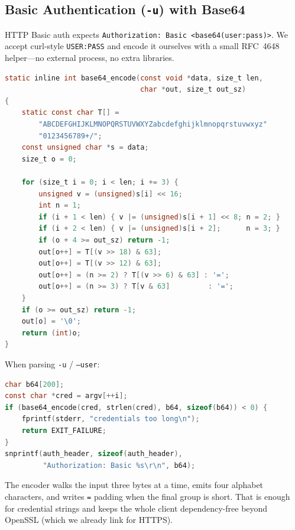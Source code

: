 \subsection{Basic Authentication (\texttt{-u}) with Base64}

HTTP Basic auth expects
\texttt{Authorization: Basic <base64(user:pass)>}.
We accept curl-style \texttt{USER:PASS} and encode it ourselves with a small
RFC~4648 helper---no external process, no extra libraries.

\begin{lstlisting}[style=snippet,language=C]
static inline int base64_encode(const void *data, size_t len,
                                char *out, size_t out_sz)
{
    static const char T[] =
        "ABCDEFGHIJKLMNOPQRSTUVWXYZabcdefghijklmnopqrstuvwxyz"
        "0123456789+/";
    const unsigned char *s = data;
    size_t o = 0;

    for (size_t i = 0; i < len; i += 3) {
        unsigned v = (unsigned)s[i] << 16;
        int n = 1;
        if (i + 1 < len) { v |= (unsigned)s[i + 1] << 8; n = 2; }
        if (i + 2 < len) { v |= (unsigned)s[i + 2];      n = 3; }
        if (o + 4 >= out_sz) return -1;
        out[o++] = T[(v >> 18) & 63];
        out[o++] = T[(v >> 12) & 63];
        out[o++] = (n >= 2) ? T[(v >> 6) & 63] : '=';
        out[o++] = (n >= 3) ? T[v & 63]         : '=';
    }
    if (o >= out_sz) return -1;
    out[o] = '\0';
    return (int)o;
}
\end{lstlisting}

When parsing \texttt{-u} / \texttt{--user}:

\begin{lstlisting}[style=snippet,language=C]
char b64[200];
const char *cred = argv[++i];
if (base64_encode(cred, strlen(cred), b64, sizeof(b64)) < 0) {
    fprintf(stderr, "credentials too long\n");
    return EXIT_FAILURE;
}
snprintf(auth_header, sizeof(auth_header),
         "Authorization: Basic %s\r\n", b64);
\end{lstlisting}

The encoder walks the input three bytes at a time, emits four alphabet
characters, and writes \texttt{=} padding when the final group is short.
That is enough for credential strings and keeps the whole client
dependency-free beyond OpenSSL (which we already link for HTTPS).

